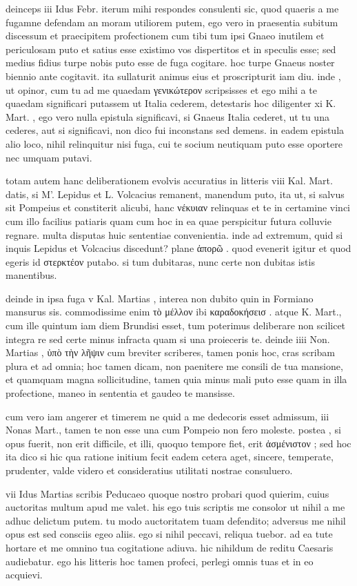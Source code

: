  deinceps iii Idus Febr. iterum mihi respondes consulenti sic, quod quaeris a me fugamne defendam an moram utiliorem putem, ego vero in praesentia subitum discessum et praecipitem profectionem cum tibi tum ipsi Gnaeo inutilem et periculosam puto et satius esse existimo vos dispertitos et in speculis esse; sed medius fidius turpe nobis puto esse de fuga cogitare. hoc turpe Gnaeus noster biennio ante cogitavit. ita sullaturit animus eius et proscripturit iam diu. inde , ut opinor, cum tu ad me quaedam γενικώτερον scripsisses et ego mihi a te quaedam significari putassem ut Italia cederem, detestaris hoc diligenter xi K. Mart. , ego vero nulla epistula significavi, si Gnaeus Italia cederet, ut tu una cederes, aut si significavi, non dico fui inconstans sed demens. in eadem epistula alio loco, nihil relinquitur nisi fuga, cui te socium neutiquam puto esse oportere nec umquam putavi.

 totam autem hanc deliberationem evolvis accuratius in litteris viii Kal. Mart. datis, si M'. Lepidus et L. Volcacius remanent, manendum puto, ita ut, si salvus sit Pompeius et constiterit alicubi, hanc νέκυιαν relinquas et te in certamine vinci cum illo facilius patiaris quam cum hoc in ea quae perspicitur futura colluvie regnare. multa disputas huic sententiae convenientia. inde ad extremum, quid si inquis Lepidus et Volcacius discedunt? plane ἀπορῶ . quod evenerit igitur et quod egeris id στερκτέον putabo. si tum dubitaras, nunc certe non dubitas istis manentibus.

 deinde in ipsa fuga v Kal. Martias , interea non dubito quin in Formiano mansurus sis. commodissime enim τὸ μέλλον ibi καραδοκήσεισ . atque K. Mart., cum ille quintum iam diem Brundisi esset, tum poterimus deliberare non scilicet integra re sed certe minus infracta quam si una proieceris te. deinde iiii Non. Martias , ὑπὸ τὴν λῆψιν cum breviter scriberes, tamen ponis hoc, cras scribam plura et ad omnia; hoc tamen dicam, non paenitere me consili de tua mansione, et quamquam magna sollicitudine, tamen quia minus mali puto esse quam in illa profectione, maneo in sententia et gaudeo te mansisse.

 cum vero iam angerer et timerem ne quid a me dedecoris esset admissum, iii Nonas Mart., tamen te non esse una cum Pompeio non fero moleste. postea , si opus fuerit, non erit difficile, et illi, quoquo tempore fiet, erit ἀσμένιστον ; sed hoc ita dico si hic qua ratione initium fecit eadem cetera aget, sincere, temperate, prudenter, valde videro et consideratius utilitati nostrae consuluero.

 vii Idus Martias scribis Peducaeo quoque nostro probari quod quierim, cuius auctoritas multum apud me valet. his ego tuis scriptis me consolor ut nihil a me adhuc delictum putem. tu modo auctoritatem tuam defendito; adversus me nihil opus est sed consciis egeo aliis. ego si nihil peccavi, reliqua tuebor. ad ea tute hortare et me omnino tua cogitatione adiuva. hic nihildum de reditu Caesaris audiebatur. ego his litteris hoc tamen profeci, perlegi omnis tuas et in eo acquievi.
